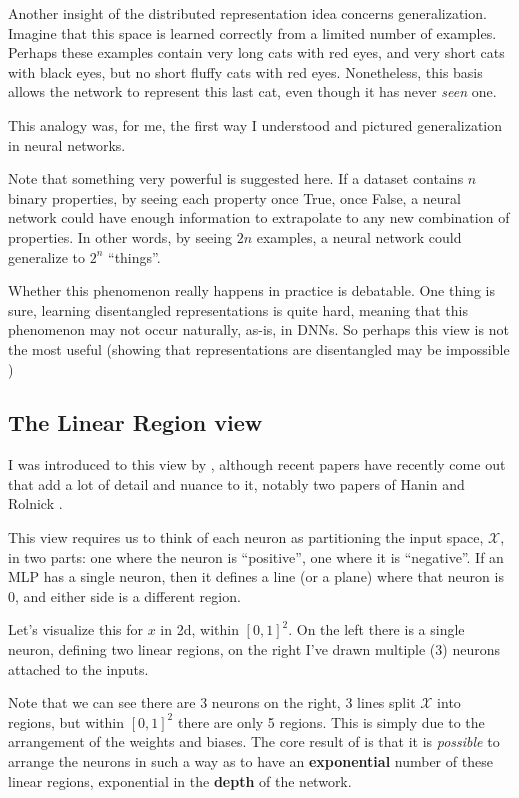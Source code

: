 
Another insight of the distributed representation idea concerns generalization. Imagine that this space is learned correctly from a limited number of examples. Perhaps these examples contain very long cats with red eyes, and very short cats with black eyes, but no short fluffy cats with red eyes. Nonetheless, this basis allows the network to represent this last cat, even though it has never \emph{seen} one.

This analogy was, for me, the first way I understood and pictured generalization in neural networks.

Note that something very powerful is suggested here. If a dataset contains $n$ binary properties, by seeing each property once True, once False, a neural network could have enough information to extrapolate to any new combination of properties. In other words, by seeing $2n$ examples, a neural network could generalize to $2^n$ ``things''.

Whether this phenomenon really happens in practice is debatable. One thing is sure, learning disentangled representations is quite hard, meaning that this phenomenon may not occur naturally, as-is, in DNNs. So perhaps this view is not the most useful (showing that representations are disentangled may be impossible \citep{locatello2018challenging})

\subsection{The Linear Region view}

I was introduced to this view by \citet{montufar2014number}, although recent papers have recently come out that add a lot of detail and nuance to it, notably two papers of Hanin and Rolnick \citep{hanin2019complexity,hanin2019deep}.

This view requires us to think of each neuron as partitioning the input space, $\mathcal{X}$, in two parts: one where the neuron is ``positive'', one where it is ``negative''. If an MLP has a single neuron, then it defines a line (or a plane) where that neuron is 0, and either side is a different region.

Let's visualize this for $x$ in 2d, within $[0,1]^2$. On the left there is a single neuron, defining two linear regions, on the right I've drawn multiple (3) neurons attached to the inputs.

Note that we can see there are 3 neurons on the right, 3 lines split $\mathcal{X}$ into regions, but within $[0,1]^2$ there are only 5 regions. This is simply due to the arrangement of the weights and biases. The core result of \citet{montufar2014number} is that it is \emph{possible} to arrange the neurons in such a way as to have an \textbf{exponential} number of these linear regions, exponential in the \textbf{depth} of the network.

